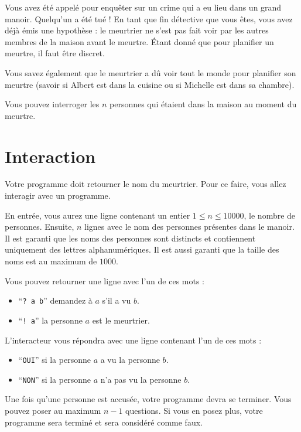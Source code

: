 \problemname{\problemyamlname}


\newcommand{\maxn}{10^4}  %

Vous avez été appelé pour enquêter sur un crime qui a eu lieu dans un grand manoir. Quelqu'un a été tué ! En tant que fin détective que vous êtes, vous avez déjà émis une hypothèse : le meurtrier ne s'est pas fait voir par les autres membres de la maison avant le meurtre. Étant donné que pour planifier un meurtre, il faut être discret.

Vous savez également que le meurtrier a dû voir tout le monde pour planifier son meurtre (savoir si Albert est dans la cuisine ou si Michelle est dans sa chambre).

Vous pouvez interroger les $n$ personnes qui étaient dans la maison au moment du meurtre.

\section*{Interaction}
Votre programme doit retourner le nom du meurtrier. Pour ce faire, vous allez interagir avec un programme.

En entrée, vous aurez une ligne contenant un entier $1 \le n \le 10000$, le nombre de personnes.
Ensuite, $n$ lignes avec le nom des personnes présentes dans le manoir. Il est garanti que les noms des personnes sont distincts et contiennent uniquement des lettres alphanumériques. Il est aussi garanti que la taille des noms est au maximum de $1000$.

Vous pouvez retourner une ligne avec l'un de ces mots :

\begin{itemize}
    \item ``\texttt{? a b}'' demandez à $a$ s'il a vu $b$.
    \item ``\texttt{! a}'' la personne $a$ est le meurtrier.
\end{itemize}

L'interacteur vous répondra avec une ligne contenant l'un de ces mots :

\begin{itemize}
    \item ``\texttt{OUI}'' si la personne $a$ a vu la personne $b$.
    \item ``\texttt{NON}'' si la personne $a$ n'a pas vu la personne $b$.
\end{itemize}

Une fois qu'une personne est accusée, votre programme devra se terminer.
Vous pouvez poser au maximum $n - 1$ questions. Si vous en posez plus, votre programme sera terminé et sera considéré comme faux.
